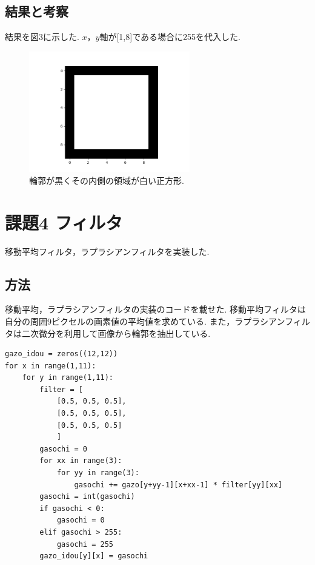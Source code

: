 \documentclass[twocolumn, 10pt,a4j]{jsarticle}
\begin{document}
    \subsection{結果と考察}
    結果を図3に示した. $x，y$軸が[1,8]である場合に255を代入した.


    \begin{figure}[H]
    \begin{center}
        \includegraphics[width=7cm]{../img/kadai_3.png}
        \caption{輪郭が黒くその内側の領域が白い正方形.}
    \end{center}
    \end{figure}

\section{課題4 フィルタ}
移動平均フィルタ，ラプラシアンフィルタを実装した.

    \subsection{方法}
    移動平均，ラプラシアンフィルタの実装のコードを載せた. 移動平均フィルタは自分の周囲9ピクセルの画素値の平均値を求めている. また，ラプラシアンフィルタは二次微分を利用して画像から輪郭を抽出している.

\begin{lstlisting}[caption=kadai4IdouHeikin.py, label=p4_txt]
gazo_idou = zeros((12,12))
for x in range(1,11):
    for y in range(1,11):
        filter = [
            [0.5, 0.5, 0.5],
            [0.5, 0.5, 0.5],
            [0.5, 0.5, 0.5]
            ]
        gasochi = 0
        for xx in range(3):
            for yy in range(3):
                gasochi += gazo[y+yy-1][x+xx-1] * filter[yy][xx]
        gasochi = int(gasochi) 
        if gasochi < 0:
            gasochi = 0
        elif gasochi > 255:
            gasochi = 255
        gazo_idou[y][x] = gasochi
\end{lstlisting}
\end{document}
